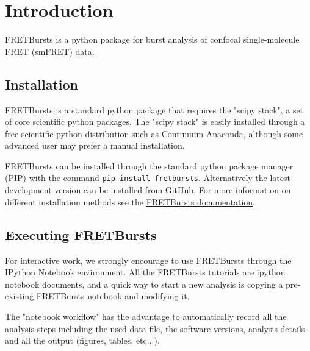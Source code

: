 \section{Introduction}

FRETBursts is a python package for burst analysis of confocal single-molecule FRET (smFRET) data.

\subsection{Installation}
FRETBursts is a standard python package that requires the "scipy stack", a set of core scientific python packages.
The "scipy stack" is easily installed through a free scientific python distribution such as Continuum Anaconda, although some advanced user may prefer a manual installation.

FRETBursts can be installed through the standard python package manager (PIP) with 
the command \verb|pip install fretbursts|. Alternatively the latest development version can be installed from GitHub.
For more information on different installation methods see the \href{http://fretbursts.readthedocs.org/installation.html#installation}{FRETBursts documentation}.

\subsection{Executing FRETBursts}
For interactive work, we strongly encourage to use FRETBursts through the IPython Notebook environment. All the FRETBursts tutorials are ipython notebook documents, and a quick way to start a new analysis is copying a pre-existing FRETBursts notebook and modifying it.

The "notebook workflow" has the advantage to automatically record all the analysis steps including the used data file, the software versions, analysis details and all the output (figures, tables, etc...).
